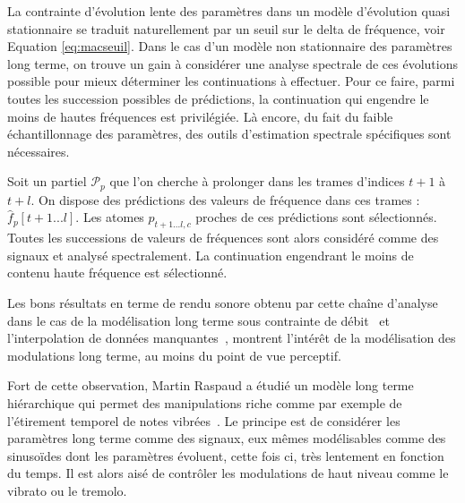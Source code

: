 La contrainte d'évolution lente des paramètres dans un modèle d'évolution quasi stationnaire se traduit naturellement par un seuil sur le delta de fréquence, voir Equation \ref{eq:macseuil}. Dans le cas d'un modèle non stationnaire des paramètres long terme, on trouve un gain à considérer une analyse spectrale de ces évolutions possible pour mieux déterminer les continuations à effectuer. Pour ce faire, parmi toutes les succession possibles de prédictions, la continuation qui engendre le moins de hautes fréquences est privilégiée. Là encore, du fait du faible échantillonnage des paramètres, des outils d'estimation spectrale spécifiques sont nécessaires.


Soit un partiel $\mathcal{P}_{p}$ que l'on cherche à prolonger dans les trames d'indices $t+1$ à $t+l$. On dispose des prédictions des valeurs de fréquence dans ces trames : $\hat{f}_{p}[t+1...l]$. Les atomes $p_{t+1...l, c}$ proches de ces prédictions sont sélectionnés. Toutes les successions de valeurs de fréquences sont alors considéré comme des signaux et analysé spectralement. La continuation engendrant le moins de contenu haute fréquence est sélectionné.


Les bons résultats en terme de rendu sonore obtenu par cette chaîne d'analyse dans le cas  de la modélisation long terme sous contrainte de débit~\cite{lagrangeTaslp06} et l'interpolation de données manquantes~\cite{lagrangeJaes05}, montrent l'intérêt de la modélisation des modulations long terme, au moins du point de vue perceptif.

Fort de cette observation, Martin Raspaud a étudié un modèle long terme hiérarchique qui permet des manipulations riche comme par exemple de l'étirement temporel de notes vibrées~\cite{raspaud2007modeles}. Le principe est de considérer les paramètres long terme comme des signaux, eux mêmes modélisables comme des sinusoïdes dont les paramètres évoluent, cette fois ci, très lentement en fonction du temps. Il est alors aisé de contrôler les modulations de haut niveau comme le vibrato ou le tremolo.

